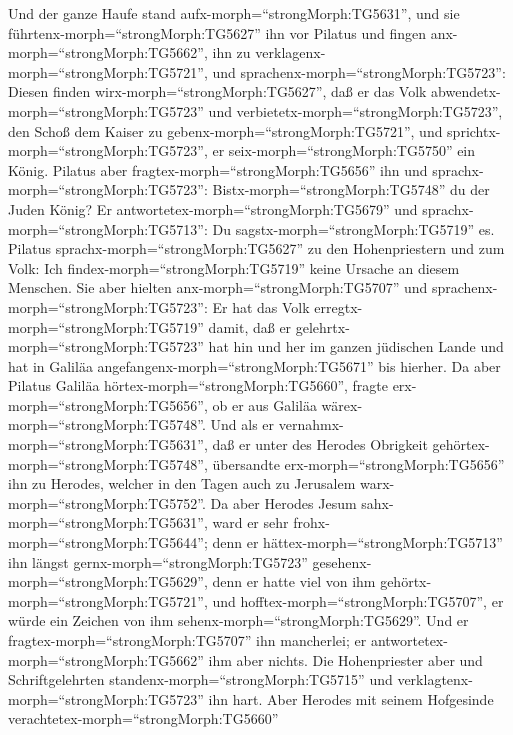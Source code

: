  Und der ganze Haufe stand
aufx-morph=``strongMorph:TG5631'', und sie
führtenx-morph=``strongMorph:TG5627'' ihn vor Pilatus  und
fingen anx-morph=``strongMorph:TG5662'', ihn zu
verklagenx-morph=``strongMorph:TG5721'', und
sprachenx-morph=``strongMorph:TG5723'': Diesen finden
wirx-morph=``strongMorph:TG5627'', daß er das Volk
abwendetx-morph=``strongMorph:TG5723'' und
verbietetx-morph=``strongMorph:TG5723'', den Schoß dem Kaiser zu
gebenx-morph=``strongMorph:TG5721'', und
sprichtx-morph=``strongMorph:TG5723'', er
seix-morph=``strongMorph:TG5750'' ein König.  Pilatus aber
fragtex-morph=``strongMorph:TG5656'' ihn und
sprachx-morph=``strongMorph:TG5723'': Bistx-morph=``strongMorph:TG5748''
du der Juden König? Er antwortetex-morph=``strongMorph:TG5679'' und
sprachx-morph=``strongMorph:TG5713'': Du
sagstx-morph=``strongMorph:TG5719'' es.  Pilatus
sprachx-morph=``strongMorph:TG5627'' zu den Hohenpriestern und zum Volk:
Ich findex-morph=``strongMorph:TG5719'' keine Ursache an diesem
Menschen.  Sie aber hielten anx-morph=``strongMorph:TG5707''
und sprachenx-morph=``strongMorph:TG5723'': Er hat das Volk
erregtx-morph=``strongMorph:TG5719'' damit, daß er
gelehrtx-morph=``strongMorph:TG5723'' hat hin und her im ganzen
jüdischen Lande und hat in Galiläa
angefangenx-morph=``strongMorph:TG5671'' bis hierher.  Da
aber Pilatus Galiläa hörtex-morph=``strongMorph:TG5660'', fragte
erx-morph=``strongMorph:TG5656'', ob er aus Galiläa
wärex-morph=``strongMorph:TG5748''.  Und als er
vernahmx-morph=``strongMorph:TG5631'', daß er unter des Herodes
Obrigkeit gehörtex-morph=``strongMorph:TG5748'', übersandte
erx-morph=``strongMorph:TG5656'' ihn zu Herodes, welcher in den Tagen
auch zu Jerusalem warx-morph=``strongMorph:TG5752''.  Da
aber Herodes Jesum sahx-morph=``strongMorph:TG5631'', ward er sehr
frohx-morph=``strongMorph:TG5644''; denn er
hättex-morph=``strongMorph:TG5713'' ihn längst
gernx-morph=``strongMorph:TG5723''
gesehenx-morph=``strongMorph:TG5629'', denn er hatte viel von ihm
gehörtx-morph=``strongMorph:TG5721'', und
hofftex-morph=``strongMorph:TG5707'', er würde ein Zeichen von ihm
sehenx-morph=``strongMorph:TG5629''.  Und er
fragtex-morph=``strongMorph:TG5707'' ihn mancherlei; er
antwortetex-morph=``strongMorph:TG5662'' ihm aber nichts. 
Die Hohenpriester aber und Schriftgelehrten
standenx-morph=``strongMorph:TG5715'' und
verklagtenx-morph=``strongMorph:TG5723'' ihn hart.  Aber
Herodes mit seinem Hofgesinde verachtetex-morph=``strongMorph:TG5660''
